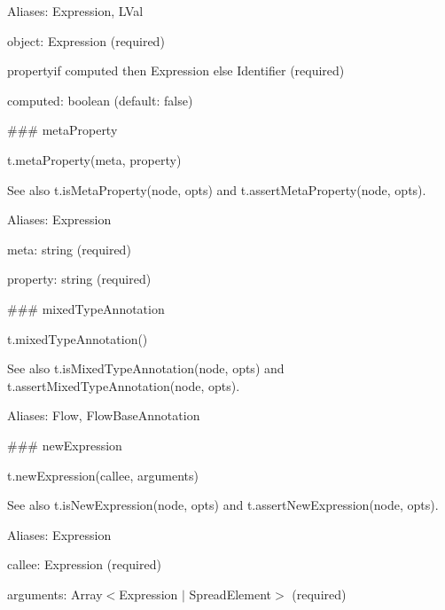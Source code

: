 Aliases\+: {\ttfamily Expression}, {\ttfamily L\+Val}


\begin{DoxyItemize}
\item {\ttfamily object}\+: {\ttfamily Expression} (required)
\item {\ttfamily property}if computed then {\ttfamily Expression} else {\ttfamily Identifier} (required)
\item {\ttfamily computed}\+: {\ttfamily boolean} (default\+: {\ttfamily false}) 


\end{DoxyItemize}

\#\#\# meta\+Property 
\begin{DoxyCode}
t.metaProperty(meta, property)
\end{DoxyCode}


See also {\ttfamily t.\+is\+Meta\+Property(node, opts)} and {\ttfamily t.\+assert\+Meta\+Property(node, opts)}.

Aliases\+: {\ttfamily Expression}


\begin{DoxyItemize}
\item {\ttfamily meta}\+: {\ttfamily string} (required)
\item {\ttfamily property}\+: {\ttfamily string} (required) 


\end{DoxyItemize}

\#\#\# mixed\+Type\+Annotation 
\begin{DoxyCode}
t.mixedTypeAnnotation()
\end{DoxyCode}


See also {\ttfamily t.\+is\+Mixed\+Type\+Annotation(node, opts)} and {\ttfamily t.\+assert\+Mixed\+Type\+Annotation(node, opts)}.

Aliases\+: {\ttfamily Flow}, {\ttfamily Flow\+Base\+Annotation}





\#\#\# new\+Expression 
\begin{DoxyCode}
t.newExpression(callee, arguments)
\end{DoxyCode}


See also {\ttfamily t.\+is\+New\+Expression(node, opts)} and {\ttfamily t.\+assert\+New\+Expression(node, opts)}.

Aliases\+: {\ttfamily Expression}


\begin{DoxyItemize}
\item {\ttfamily callee}\+: {\ttfamily Expression} (required)
\item {\ttfamily arguments}\+: {\ttfamily Array$<$Expression $\vert$ Spread\+Element$>$} (required) 


\end{DoxyItemize}

